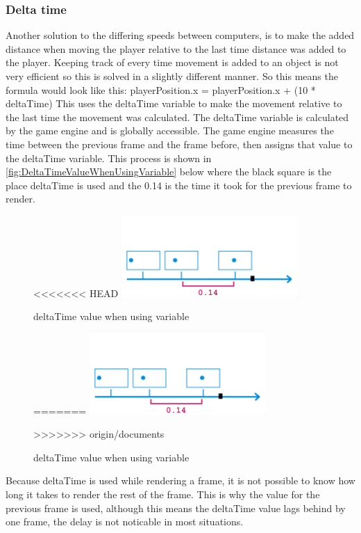 \documentclass{article} %
\begin{document}
\subsubsection{Delta time}
Another solution to the differing speeds between computers, is to make the added distance when moving the player relative to the last time distance was added to the player.
Keeping track of every time movement is added to an object is not very efficient so this is solved in a slightly different manner.
So this means the formula would look like this:
\newline
playerPosition.x = playerPosition.x + (10 * deltaTime)
\newline
This uses the deltaTime variable to make the movement relative to the last time the movement was calculated.
\newline\newline
The deltaTime variable is calculated by the game engine and is globally accessible.
The game engine measures the time between the previous frame and the frame before, then assigns that value to the deltaTime variable.
This process is shown in \autoref{fig:DeltaTimeValueWhenUsingVariable}  below where the black square is the place deltaTime is used and the 0.14 is the time it took for the previous frame to render.
\begin{figure}[h!]
<<<<<<< HEAD
    \centering
    \includegraphics[width=0.6\textwidth]{used_deltatime_when_using_variable.png}
    \caption{deltaTime value when using variable}
=======
	\centering
	\includegraphics[width=0.6\textwidth]{used_deltatime_when_using_variable.png}
	\caption{deltaTime value when using variable}
	\label{fig:DeltaTimeValueWhenUsingVariable}
>>>>>>> origin/documents
\end{figure}
\newline
Because deltaTime is used while rendering a frame, it is not possible to know how long it takes to render the rest of the frame.
This is why the value for the previous frame is used, although this means the deltaTime value lags behind by one frame, the delay is not noticable in most situations.
\end{document}
